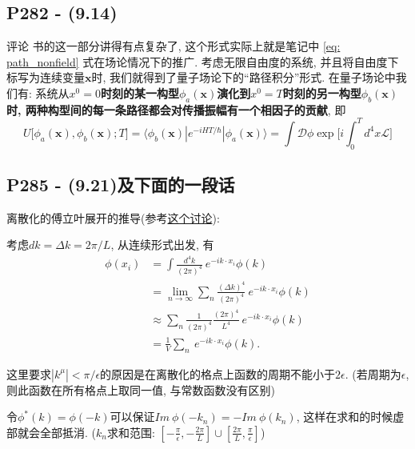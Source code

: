 \subsection{P282 - (9.14)}

\begin{mybox}{评论}
  书的这一部分讲得有点复杂了, 这个形式实际上就是笔记中 \eqref{eq: path_nonfield} 式在场论情况下的推广.
  考虑无限自由度的系统, 并且将自由度下标写为连续变量$\mathbf{x}$时, 我们就得到了量子场论下的“路径积分”形式.
  在量子场论中我们有: 系统从\textbf{$x^0=0$时刻的某一构型$\phi_a(\mathbf{x})$演化到$x^0=T$时刻的另一构型$\phi_b(\mathbf{x})$时, 两种构型间的每一条路径都会对传播振幅有一个相因子的贡献}, 即
  \begin{equation*}
    U\bigl[\phi_a(\mathbf{x}),\phi_b(\mathbf{x});T\bigr]=\langle \phi_b(\mathbf{x})|e^{-iHT/\hbar}|\phi_a(\mathbf{x}) \rangle = \int \mathcal{D}\phi \exp\biggl[i\int_{0}^{T} d^4x\mathcal{L}\biggr]
  \end{equation*}
\end{mybox}

\subsection{P285 - (9.21)及下面的一段话}

离散化的傅立叶展开的推导(参考\href{https://physics.stackexchange.com/questions/533991/the-discrete-fourier-series-in-peskin-and-schroeder-page-285}{这个讨论}):

考虑$dk = \Delta k = 2\pi/L$, 从连续形式出发, 有
\begin{equation}
  \begin{aligned}
    \phi(x_i) & = \int \frac{d^4 k}{(2\pi)^4} \ e^{-ik\cdot x_i}\phi(k)                                   \\
              & = \lim_{n\rightarrow\infty}\sum_n \frac{(\Delta k)^4}{(2\pi)^4} \ e^{-ik\cdot x_i}\phi(k) \\
              & \approx \sum_n \frac{1}{(2\pi)^4} \frac{(2\pi)^4}{L^4}\ e^{-ik\cdot x_i}\phi(k)           \\
              & = \frac{1}{V} \sum_n \ e^{-ik\cdot x_i}\phi(k).
  \end{aligned}
\end{equation}

这里要求$|k^{\mu}| < \pi/\epsilon$的原因是在离散化的格点上函数的周期不能小于$2\epsilon$.
(若周期为$\epsilon$, 则此函数在所有格点上取同一值, 与常数函数没有区别)

令$\phi^*(k) = \phi(-k)$可以保证$Im\ \phi(-k_n) = -Im\ \phi(k_n)$, 这样在求和的时候虚部就会全部抵消.
($k_n$求和范围: $[-\frac{\pi}{\epsilon}, -\frac{2\pi}{L}]\cup [\frac{2\pi}{L}, \frac{\pi}{\epsilon}]$)

